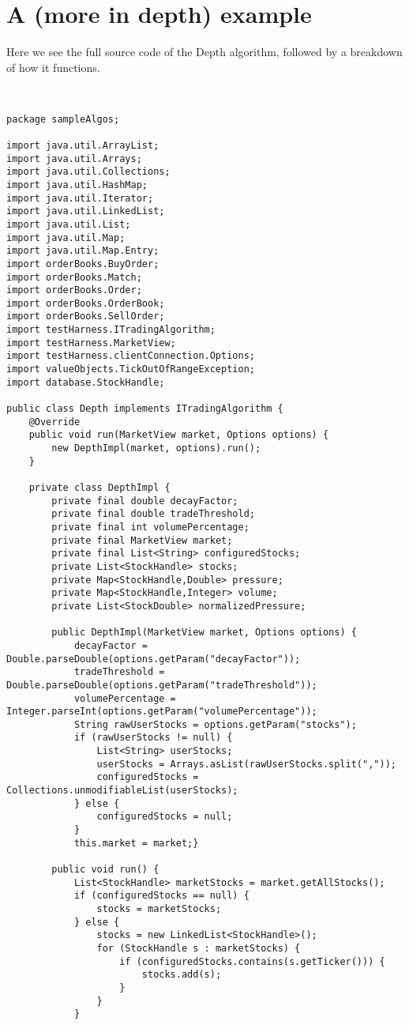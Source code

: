\documentclass[11pt]{article}
\begin{document}
\section{A (more in depth) example}
Here we see the full source code of the Depth algorithm, followed by a breakdown of how it functions.
\begingroup
    \fontsize{8pt}{8pt}\selectfont    \begin{verbatim}  


package sampleAlgos;

import java.util.ArrayList;
import java.util.Arrays;
import java.util.Collections;
import java.util.HashMap;
import java.util.Iterator;
import java.util.LinkedList;
import java.util.List;
import java.util.Map;
import java.util.Map.Entry;
import orderBooks.BuyOrder;
import orderBooks.Match;
import orderBooks.Order;
import orderBooks.OrderBook;
import orderBooks.SellOrder;
import testHarness.ITradingAlgorithm;
import testHarness.MarketView;
import testHarness.clientConnection.Options;
import valueObjects.TickOutOfRangeException;
import database.StockHandle;

public class Depth implements ITradingAlgorithm {
	@Override
	public void run(MarketView market, Options options) {
		new DepthImpl(market, options).run();
	}
	
	private class DepthImpl {
		private final double decayFactor;
		private final double tradeThreshold;
		private final int volumePercentage;
		private final MarketView market;
		private final List<String> configuredStocks;
		private List<StockHandle> stocks;
		private Map<StockHandle,Double> pressure;
		private Map<StockHandle,Integer> volume;
		private List<StockDouble> normalizedPressure;
		
		public DepthImpl(MarketView market, Options options) {
			decayFactor = Double.parseDouble(options.getParam("decayFactor"));
			tradeThreshold = Double.parseDouble(options.getParam("tradeThreshold"));
			volumePercentage = Integer.parseInt(options.getParam("volumePercentage"));			
			String rawUserStocks = options.getParam("stocks");
			if (rawUserStocks != null) {
				List<String> userStocks;
				userStocks = Arrays.asList(rawUserStocks.split(","));
				configuredStocks = Collections.unmodifiableList(userStocks);
			} else {
				configuredStocks = null;
			}			
			this.market = market;}	
		
		public void run() {
			List<StockHandle> marketStocks = market.getAllStocks();
			if (configuredStocks == null) {
				stocks = marketStocks;
			} else {
				stocks = new LinkedList<StockHandle>();
				for (StockHandle s : marketStocks) {
					if (configuredStocks.contains(s.getTicker())) {
						stocks.add(s);
					}
				}
			}
			

\end{verbatim}
\end{document}
